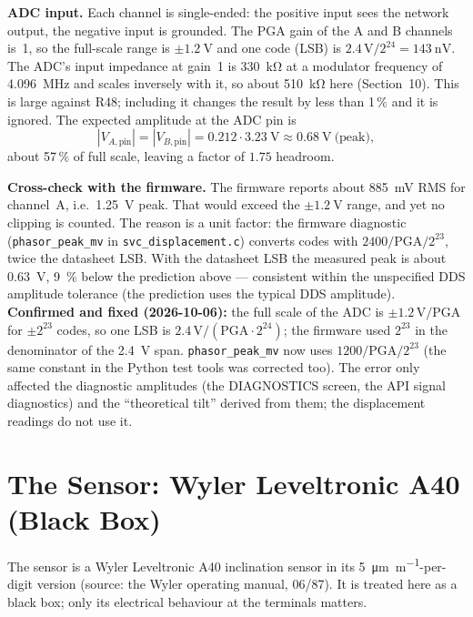 \documentclass[11pt,a4paper]{article}
\begin{document}
\textbf{ADC input.}  Each channel is single-ended: the positive input sees
the network output, the negative input is grounded.  The PGA gain of the A
and B channels is~1, so the full-scale range is $\pm\SI{1.2}{\volt}$ and one
code (LSB) is $2.4\,\mathrm{V}/2^{24}=\SI{143}{\nano\volt}$.  The ADC's
input impedance at gain~1 is \SI{330}{\kilo\ohm} at a modulator frequency of
\SI{4.096}{\mega\hertz} and scales inversely with it, so about
\SI{510}{\kilo\ohm} here (Section~10).  This is large against R48; including
it changes the result by less than 1\,\% and it is ignored.  The expected
amplitude at the ADC pin is
\begin{equation}
  |V_{A,\mathrm{pin}}| = |V_{B,\mathrm{pin}}| = 0.212\cdot\SI{3.23}{\volt}
  \approx \SI{0.68}{\volt}\ \text{(peak)},
\end{equation}
about 57\,\% of full scale, leaving a factor of $1.75$ headroom.

\textbf{Cross-check with the firmware.}  The firmware reports about
\SI{885}{\milli\volt} RMS for channel~A, i.e.\ \SI{1.25}{\volt} peak.  That
would exceed the $\pm\SI{1.2}{\volt}$ range, and yet no clipping is
counted.  The reason is a unit factor: the firmware diagnostic
(\texttt{phasor\_peak\_mv} in \texttt{svc\_displacement.c}) converts codes
with $2400/\mathrm{PGA}/2^{23}$, twice the datasheet LSB.  With the
datasheet LSB the measured peak is about \SI{0.63}{\volt}, \SI{9}{\percent}
below the prediction above --- consistent within the unspecified DDS
amplitude tolerance (the prediction uses the typical DDS amplitude).
\textbf{Confirmed and fixed (2026-10-06):} the full scale of the ADC is
$\pm1.2\,\mathrm{V}/\mathrm{PGA}$ for $\pm2^{23}$ codes, so one LSB is
$2.4\,\mathrm{V}/(\mathrm{PGA}\cdot2^{24})$; the firmware used $2^{23}$ in
the denominator of the \SI{2.4}{\volt} span.  \texttt{phasor\_peak\_mv} now uses
$1200/\mathrm{PGA}/2^{23}$ (the same constant in the Python test tools was
corrected too).  The error only affected the diagnostic amplitudes (the
DIAGNOSTICS screen, the API signal diagnostics) and the ``theoretical
tilt'' derived from them; the displacement readings do not use it.

\section{The Sensor: Wyler Leveltronic A40 (Black Box)}

The sensor is a Wyler Leveltronic A40 inclination sensor in its
\SI{5}{\micro\metre\per\metre}-per-digit version (source: the Wyler
operating manual, 06/87).  It is treated here as a black box; only its
electrical behaviour at the terminals matters.
\end{document}
